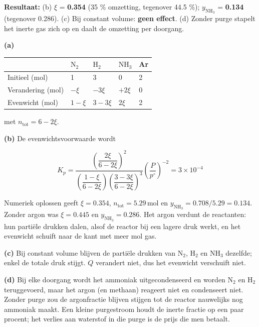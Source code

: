 \begin{oplossing}
\textbf{Resultaat:} (b) \(\xi\) = \textbf{0.354} (35 \% omzetting, tegenover 44.5 \%); \(y_{\mathrm{NH_3}}\) = \textbf{0.134} (tegenover 0.286). (c) Bij constant volume: \textbf{geen effect}. (d) Zonder purge stapelt het inerte gas zich op en daalt de omzetting per doorgang.

\textbf{(a)}

\begin{center}
\begin{tabular}{lllll}
\toprule
 & \(\mathrm{N_2}\) & \(\mathrm{H_2}\) & \(\mathrm{NH_3}\) & Ar \\
\midrule
Initieel (mol) & 1 & 3 & 0 & 2 \\
Verandering (mol) & \(-\xi\) & \(-3\xi\) & \(+2\xi\) & 0 \\
Evenwicht (mol) & \(1-\xi\) & \(3-3\xi\) & \(2\xi\) & 2 \\
\bottomrule
\end{tabular}
\end{center}

met \(n_{\text{tot}} = 6 - 2\xi\).

\textbf{(b)} De evenwichtsvoorwaarde wordt

\[
K_p = \frac{\left(\dfrac{2\xi}{6-2\xi}\right)^2}{\left(\dfrac{1-\xi}{6-2\xi}\right)\left(\dfrac{3-3\xi}{6-2\xi}\right)^3}\left(\frac{P}{p^\circ}\right)^{-2} = 3\times10^{-4}
\]

Numeriek oplossen geeft \(\xi = 0.354\), \(n_{\text{tot}} = 5.29\,\mathrm{mol}\) en \(y_{\mathrm{NH_3}} = 0.708/5.29 = 0.134\). Zonder argon was \(\xi = 0.445\) en \(y_{\mathrm{NH_3}} = 0.286\). Het argon verdunt de reactanten: hun partiële drukken dalen, alsof de reactor bij een lagere druk werkt, en het evenwicht schuift naar de kant met meer mol gas.

\textbf{(c)} Bij constant volume blijven de partiële drukken van \(\mathrm{N_2}\), \(\mathrm{H_2}\) en \(\mathrm{NH_3}\) dezelfde; enkel de totale druk stijgt. \(Q\) verandert niet, dus het evenwicht verschuift niet.

\textbf{(d)} Bij elke doorgang wordt het ammoniak uitgecondenseerd en worden \(\mathrm{N_2}\) en \(\mathrm{H_2}\) teruggevoerd, maar het argon (en methaan) reageert niet en condenseert niet. Zonder purge zou de argonfractie blijven stijgen tot de reactor nauwelijks nog ammoniak maakt. Een kleine purgestroom houdt de inerte fractie op een paar procent; het verlies aan waterstof in die purge is de prijs die men betaalt.
\end{oplossing}

